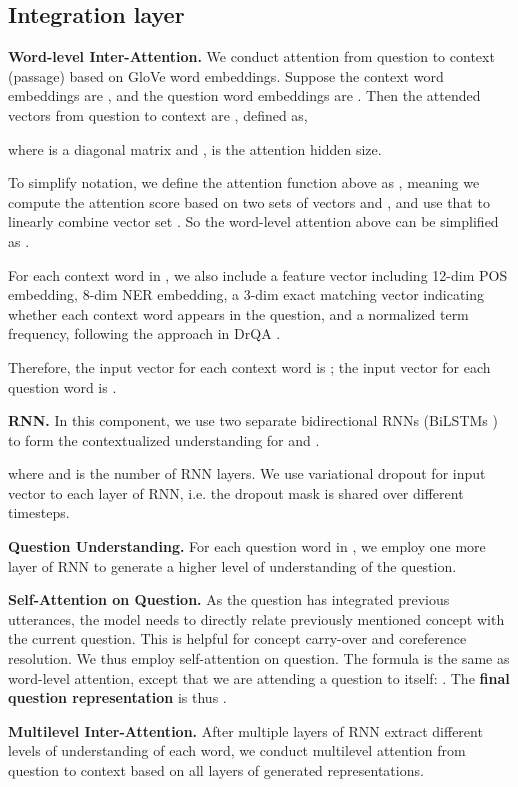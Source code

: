 \documentclass{article} \usepackage{sdnet,times}
\begin{document}
\subsection{Integration layer}
\textbf{Word-level Inter-Attention.} We conduct attention from question to context (passage) based on GloVe word embeddings. Suppose the context word embeddings are , and the question word embeddings are . Then the attended vectors from question to context are , defined as,
 



where  is a diagonal matrix and ,  is the attention hidden size. 

To simplify notation, we define the attention function above as , meaning we compute the attention score  based on two sets of vectors  and , and use that to linearly combine vector set . So the word-level attention above can be simplified as .

For each context word in , we also include a feature vector  including 12-dim POS embedding, 8-dim NER embedding, a 3-dim exact matching vector  indicating whether each context word appears in the question, and a normalized term frequency, following the approach in DrQA \citep{drqa}.

Therefore, the input vector for each context word is ; the input vector for each question word is .

\textbf{RNN.} In this component, we use two separate bidirectional RNNs (BiLSTMs \citep{lstm}) to form the contextualized understanding for  and .



where  and  is the number of RNN layers. We use variational dropout \citep{vd} for input vector to each layer of RNN, i.e. the dropout mask is shared over different timesteps.

\textbf{Question Understanding.} For each question word in , we employ one more layer of RNN to generate a higher level of understanding of the question.



\textbf{Self-Attention on Question.} As the question has integrated previous utterances, the model needs to directly relate previously mentioned concept with the current question. This is helpful for concept carry-over and coreference resolution. We thus employ self-attention on question. The formula is the same as word-level attention, except that we are attending a question to itself: . The \textbf{final question representation} is thus .

\textbf{Multilevel Inter-Attention.} After multiple layers of RNN extract different levels of understanding of each word, we conduct multilevel attention from question to context based on all layers of generated representations.
\end{document}
